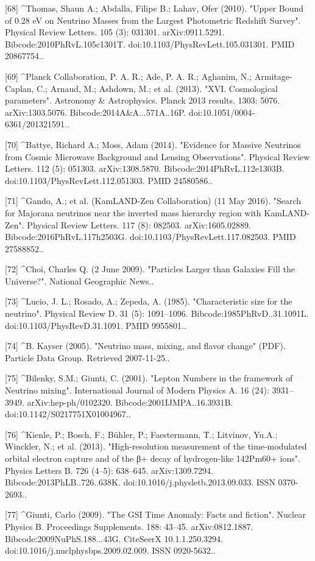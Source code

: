 [68]
^Thomas, Shaun A.; Abdalla, Filipe B.; Lahav, Ofer (2010). "Upper Bound of 0.28 eV on Neutrino Masses from the Largest Photometric Redshift Survey". Physical Review Letters. 105 (3): 031301. arXiv:0911.5291. Bibcode:2010PhRvL.105c1301T. doi:10.1103/PhysRevLett.105.031301. PMID 20867754..

[69]
^Planck Collaboration, P. A. R.; Ade, P. A. R.; Aghanim, N.; Armitage-Caplan, C.; Arnaud, M.; Ashdown, M.; et al. (2013). "XVI. Cosmological parameters". Astronomy & Astrophysics. Planck 2013 results. 1303: 5076. arXiv:1303.5076. Bibcode:2014A&A...571A..16P. doi:10.1051/0004-6361/201321591..

[70]
^Battye, Richard A.; Moss, Adam (2014). "Evidence for Massive Neutrinos from Cosmic Microwave Background and Lensing Observations". Physical Review Letters. 112 (5): 051303. arXiv:1308.5870. Bibcode:2014PhRvL.112e1303B. doi:10.1103/PhysRevLett.112.051303. PMID 24580586..

[71]
^Gando, A.; et al. (KamLAND-Zen Collaboration) (11 May 2016). "Search for Majorana neutrinos near the inverted mass hierarchy region with KamLAND-Zen". Physical Review Letters. 117 (8): 082503. arXiv:1605.02889. Bibcode:2016PhRvL.117h2503G. doi:10.1103/PhysRevLett.117.082503. PMID 27588852..

[72]
^Choi, Charles Q. (2 June 2009). "Particles Larger than Galaxies Fill the Universe?". National Geographic News..

[73]
^Lucio, J. L.; Rosado, A.; Zepeda, A. (1985). "Characteristic size for the neutrino". Physical Review D. 31 (5): 1091–1096. Bibcode:1985PhRvD..31.1091L. doi:10.1103/PhysRevD.31.1091. PMID 9955801..

[74]
^B. Kayser (2005). "Neutrino mass, mixing, and flavor change" (PDF). Particle Data Group. Retrieved 2007-11-25..

[75]
^Bilenky, S.M.; Giunti, C. (2001). "Lepton Numbers in the framework of Neutrino mixing". International Journal of Modern Physics A. 16 (24): 3931–3949. arXiv:hep-ph/0102320. Bibcode:2001IJMPA..16.3931B. doi:10.1142/S0217751X01004967..

[76]
^Kienle, P.; Bosch, F.; Bühler, P.; Faestermann, T.; Litvinov, Yu.A.; Winckler, N.; et al. (2013). "High-resolution measurement of the time-modulated orbital electron capture and of the β+ decay of hydrogen-like 142Pm60+ ions". Physics Letters B. 726 (4–5): 638–645. arXiv:1309.7294. Bibcode:2013PhLB..726..638K. doi:10.1016/j.physletb.2013.09.033. ISSN 0370-2693..

[77]
^Giunti, Carlo (2009). "The GSI Time Anomaly: Facts and fiction". Nuclear Physics B. Proceedings Supplements. 188: 43–45. arXiv:0812.1887. Bibcode:2009NuPhS.188...43G. CiteSeerX 10.1.1.250.3294. doi:10.1016/j.nuclphysbps.2009.02.009. ISSN 0920-5632..

